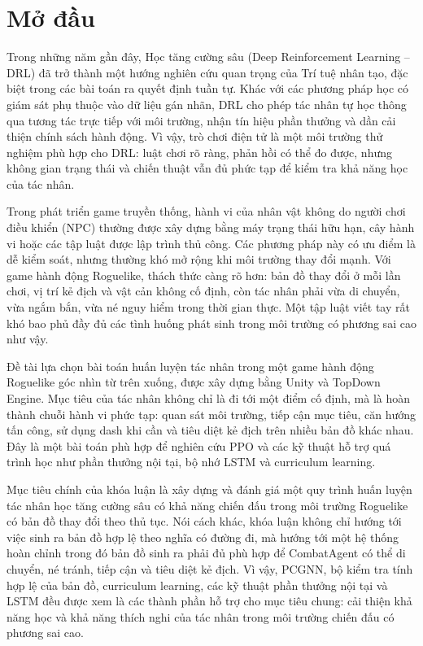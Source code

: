 \clearpage
{}

\chapter*{Mở đầu}


Trong những năm gần đây, Học tăng cường sâu (Deep Reinforcement Learning -- DRL) đã trở thành một hướng nghiên cứu quan trọng của Trí tuệ nhân tạo, đặc biệt trong các bài toán ra quyết định tuần tự. Khác với các phương pháp học có giám sát phụ thuộc vào dữ liệu gán nhãn, DRL cho phép tác nhân tự học thông qua tương tác trực tiếp với môi trường, nhận tín hiệu phần thưởng và dần cải thiện chính sách hành động. Vì vậy, trò chơi điện tử là một môi trường thử nghiệm phù hợp cho DRL: luật chơi rõ ràng, phản hồi có thể đo được, nhưng không gian trạng thái và chiến thuật vẫn đủ phức tạp để kiểm tra khả năng học của tác nhân.

Trong phát triển game truyền thống, hành vi của nhân vật không do người chơi điều khiển (NPC) thường được xây dựng bằng máy trạng thái hữu hạn, cây hành vi hoặc các tập luật được lập trình thủ công. Các phương pháp này có ưu điểm là dễ kiểm soát, nhưng thường khó mở rộng khi môi trường thay đổi mạnh. Với game hành động Roguelike, thách thức càng rõ hơn: bản đồ thay đổi ở mỗi lần chơi, vị trí kẻ địch và vật cản không cố định, còn tác nhân phải vừa di chuyển, vừa ngắm bắn, vừa né nguy hiểm trong thời gian thực. Một tập luật viết tay rất khó bao phủ đầy đủ các tình huống phát sinh trong môi trường có phương sai cao như vậy.

Đề tài lựa chọn bài toán huấn luyện tác nhân trong một game hành động Roguelike góc nhìn từ trên xuống, được xây dựng bằng Unity và TopDown Engine. Mục tiêu của tác nhân không chỉ là đi tới một điểm cố định, mà là hoàn thành chuỗi hành vi phức tạp: quan sát môi trường, tiếp cận mục tiêu, căn hướng tấn công, sử dụng dash khi cần và tiêu diệt kẻ địch trên nhiều bản đồ khác nhau. Đây là một bài toán phù hợp để nghiên cứu PPO và các kỹ thuật hỗ trợ quá trình học như phần thưởng nội tại, bộ nhớ LSTM và curriculum learning.
\newpage
\vspace{0.3cm}

Mục tiêu chính của khóa luận là xây dựng và đánh giá một quy trình huấn luyện tác nhân học tăng cường sâu có khả năng chiến đấu trong môi trường Roguelike có bản đồ thay đổi theo thủ tục. Nói cách khác, khóa luận không chỉ hướng tới việc sinh ra bản đồ hợp lệ theo nghĩa có đường đi, mà hướng tới một hệ thống hoàn chỉnh trong đó bản đồ sinh ra phải đủ phù hợp để CombatAgent có thể di chuyển, né tránh, tiếp cận và tiêu diệt kẻ địch. Vì vậy, PCGNN, bộ kiểm tra tính hợp lệ của bản đồ, curriculum learning, các kỹ thuật phần thưởng nội tại và LSTM đều được xem là các thành phần hỗ trợ cho mục tiêu chung: cải thiện khả năng học và khả năng thích nghi của tác nhân trong môi trường chiến đấu có phương sai cao.

